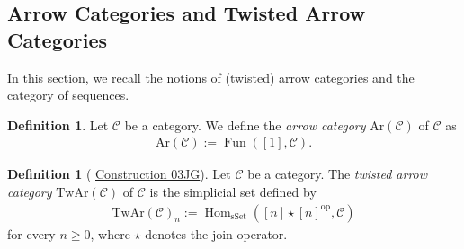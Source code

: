 \documentclass[a4paper,dvipdfmx,11pt,reqno]{amsart}
\DeclareMathOperator{\Hom}{Hom}
\DeclareMathOperator{\Map}{Map}
\DeclareMathOperator{\myop}{op}
\DeclareMathOperator{\Fun}{Fun}
\newcommand{\C}{\mathcal{C}}
\newcommand{\An}{\mathrm{An}}
\newcommand{\Ar}{\mathrm{Ar}}
\newcommand{\TwAr}{\mathrm{TwAr}}
\theoremstyle{definition}
\newtheorem{definition}[theorem]{Definition}
\begin{document}
\subsection{Arrow Categories and Twisted Arrow Categories} 

In this section, we recall the notions of (twisted) arrow categories and the category of sequences.

\begin{definition}
  Let $\C$ be a category.
  We define the \textit{arrow category} $\Ar(\C)$ of $\C$ as 
  \begin{align*}
    \Ar(\C) := \Fun([1],\C).
  \end{align*} 
\end{definition}

\begin{definition}[\cite{kerodon} \href{https://kerodon.net/tag/03JG}{Construction 03JG}] \label{Ber.rem.3.1}
  Let $\C$ be a category.
  The \textit{twisted arrow category} $\TwAr(\C)$ of $\C$ is the simplicial set defined by 
  \begin{align*}
    \TwAr(\C)_n := \Hom_{\mathrm{sSet}}([n] \star [n]^{\myop},\C)
  \end{align*}
  for every $n \geq 0$, where $\star$ denotes the join operator.
\end{definition}

\end{document}

